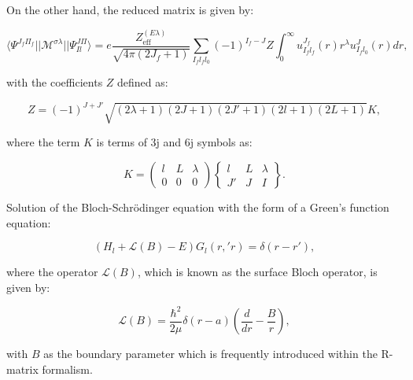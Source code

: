 \documentclass[openany]{book}
\begin{document}
On the other hand, the reduced matrix is given by: 

\begin{equation}\label{rmatrix_radiativeCapture_reducedMatrix_expression}
	\langle \Psi^{J_f\Pi_f} || \mathcal{M}^{\sigma \lambda} ||  \Psi^{J \Pi}_{Il} \rangle = e \frac{Z^{(E\lambda)}_{\mathrm{eff}}}{\sqrt{4\pi (2J_f + 1)}} \sum_{I_fl_fl_0}(-1)^{I_f - J} Z \int_0^{\infty} {u^{J_f}_{I_fl_f}(r) r^\lambda u^{J}_{I_fl_0} (r)dr}, 
\end{equation}

with the coefficients $Z$ defined as: 

\begin{equation}\label{rmatrix_radiativeCapture_Zcoefficients}
	Z = (-1)^{J + J'} \sqrt{(2\lambda + 1)(2J+ 1)(2J' + 1)(2l + 1)(2L + 1)} K ,
\end{equation}

where the term $K$ is terms of 3j and 6j symbols as: 

\begin{equation}\label{rmatrix_radiativeCapture_3j6j}
	K  = \left(\begin{matrix}
		l & L & \lambda \\
		0 & 0 & 0
	\end{matrix}\right) \left\{ \begin{matrix}
		l & L & \lambda \\
		J' & J & I
\end{matrix} \right\}.
\end{equation}



 
Solution of the Bloch-Schrödinger equation with the form of a Green's function equation:

\begin{equation}\label{rmatrix_BlochSchrodinger}
	(H_l + \mathcal{L}(B) - E)G_l(r, 'r) = \delta(r - r'),
\end{equation}

where the operator $\mathcal{L}(B)$, which is known as the surface Bloch operator,  is given by:

\begin{equation}\label{rmatrix_Bloch_operator}
	\mathcal{L}(B) = \frac{\hbar^2}{2\mu} \delta(r - a) \left(\frac{d}{dr} - \frac{B}{r}\right),
\end{equation} 

with $B$ as the boundary parameter which is frequently introduced within the R-matrix formalism. \\
\end{document}

